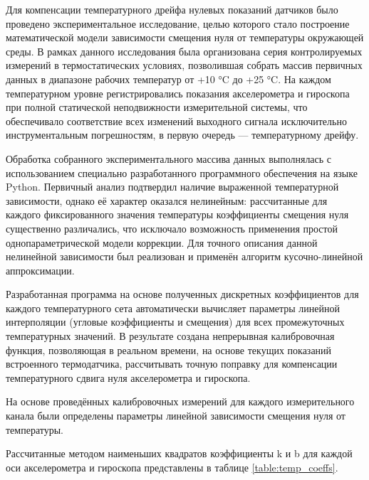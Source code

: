 
Для компенсации температурного дрейфа нулевых показаний датчиков было проведено экспериментальное исследование, целью которого стало построение математической модели зависимости смещения нуля от температуры окружающей среды. В рамках данного исследования была организована серия контролируемых измерений в термостатических условиях, позволившая собрать массив первичных данных в диапазоне рабочих температур от +10 °C до +25 °C. На каждом температурном уровне регистрировались показания акселерометра и гироскопа при полной статической неподвижности измерительной системы, что обеспечивало соответствие всех изменений выходного сигнала исключительно инструментальным погрешностям, в первую очередь — температурному дрейфу.

Обработка собранного экспериментального массива данных выполнялась с использованием специально разработанного программного обеспечения на языке Python. Первичный анализ подтвердил наличие выраженной температурной зависимости, однако её характер оказался нелинейным: рассчитанные для каждого фиксированного значения температуры коэффициенты смещения нуля существенно различались, что исключало возможность применения простой однопараметрической модели коррекции. Для точного описания данной нелинейной зависимости был реализован и применён алгоритм кусочно-линейной аппроксимации.

Разработанная программа на основе полученных дискретных коэффициентов для каждого температурного сета автоматически вычисляет параметры линейной интерполяции (угловые коэффициенты и смещения) для всех промежуточных температурных значений. В результате создана непрерывная калибровочная функция, позволяющая в реальном времени, на основе текущих показаний встроенного термодатчика, рассчитывать точную поправку для компенсации температурного сдвига нуля акселерометра и гироскопа. 


На основе проведённых калибровочных измерений для каждого измерительного канала были определены параметры линейной зависимости смещения нуля от температуры.

Рассчитанные методом наименьших квадратов коэффициенты k и b для каждой оси акселерометра и гироскопа представлены в таблице \ref{table:temp_coeffs}.

